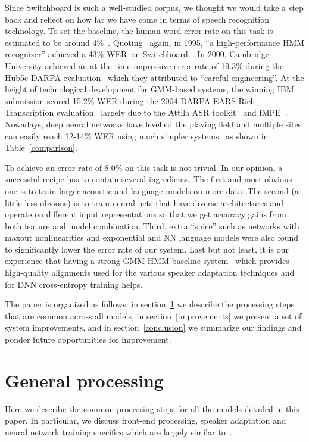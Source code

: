 \documentclass[a4paper]{article}
\begin{document}
Since Switchboard is such a well-studied corpus, we thought we would
take a step back and reflect on how far we have come in terms of
speech recognition technology. To set the baseline, the human word
error rate on this task is estimated to be around
4\%~\cite{lippmann97}. Quoting~\cite{lippmann97} again, in 1995, ``a
high-performance HMM recognizer'' achieved a 43\% WER~on
Switchboard~\cite{liu95}. In 2000, Cambridge University achieved an at
the time impressive error rate of 19.3\% during the Hub5e DARPA
evaluation~\cite{hain00} which they attributed to ``careful
engineering''. At the height of technological development for
GMM-based systems, the winning IBM submission scored 15.2\% WER during
the 2004 DARPA EARS Rich Transcription evaluation~\cite{soltau05}
largely due to the Attila ASR toolkit~\cite{soltau10} and
fMPE~\cite{povey05}. Nowadays, deep neural networks have levelled the
playing field and multiple sites can easily reach 12-14\% WER using
much simpler systems~\cite{vesely13,seide14,hannun14,zhou14,maas14} as
shown in Table~\ref{comparison}.

To achieve an error rate of 8.0\% on this task is not trivial. In our
opinion, a successful recipe has to contain several ingredients. The
first and most obvious one is to train larger acoustic and language
models on more data. The second (a little less obvious) is to train
neural nets that have diverse architectures and operate on different
input representations so that we get accuracy gains from both feature
and model combination. Third, extra ``spice'' such as networks with
maxout nonlinearities and exponential and NN language models were also
found to significantly lower the error rate of our system. Last but
not least, it is our experience that having a strong GMM-HMM baseline
system~\cite{soltau10,soltau14} which provides high-quality alignments
used for the various speaker adaptation techniques and for DNN
cross-entropy training helps.

The paper is organized as follows: in section~\ref{gp} we describe the
processing steps that are common across all models, in
section~\ref{improvements} we present a set of system improvements,
and in section~\ref{conclusion} we summarize our findings and ponder
future opportunities for improvement.

\section{General processing}
\label{gp}

Here we describe the common processing steps for all the models
detailed in this paper. In particular, we discuss front-end
processing, speaker adaptation and neural network training specifics which are largely similar to~\cite{saon13,soltau14}.
\end{document}
